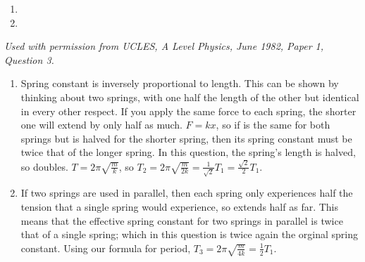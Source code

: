 
\begin{problem}[A1982PIQ3l]
{  
\begin{enumerate}

\item {}

\item {}

\end{enumerate}
}
{\textit{Used with permission from UCLES, A Level Physics, June 1982, Paper 1, Question 3.}}
{

\begin{enumerate}

	\item Spring constant  is inversely proportional to length. This can be shown by thinking about two springs, with one half the length of the other but identical in every other respect. If you apply the same force to each spring, the shorter one will extend by only half as much. $F = kx$, so if  is the same for both springs but  is halved for the shorter spring, then its spring constant  must be twice that of the longer spring. In this question, the spring's length is halved, so  doubles. $T = 2\pi\sqrt{\frac{m}{k}}$, so $T_2 = 2\pi\sqrt{\frac{m}{2k}} = \frac{1}{\sqrt{2}}T_1 = \frac{\sqrt{2}}{2}T_1$.
	
	
	\item If two springs are used in parallel, then each spring only experiences half the tension that a single spring would experience, so extends half as far. This means that the effective spring constant for two springs in parallel is twice that of a single spring; which in this question is twice again the orginal spring constant. Using our formula for period, $T_3 = 2\pi\sqrt{\frac{m}{4k}} = \frac{1}{2}T_1$.
	

\end{enumerate}
}
\end{problem}